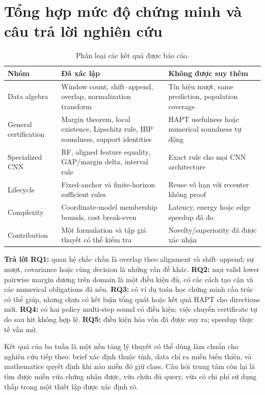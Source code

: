 \documentclass[11pt,a4paper]{article}
\theoremstyle{remark}
\begin{document}
\section{Tổng hợp mức độ chứng minh và câu trả lời nghiên cứu}
\begin{table}[htbp]\centering\small
\caption{Phân loại các kết quả được báo cáo.}
\begin{tabularx}{\linewidth}{@{}p{3.6cm}YY@{}}\toprule
Nhóm & Đã xác lập & Không được suy thêm\\\midrule
Data algebra & Window count, shift--append, overlap, normalization transform
& Tín hiệu mượt, same prediction, population coverage\\
General certification & Margin theorem, local existence, Lipschitz rule,
IBP soundness, support identities & HAPT usefulness hoặc numerical soundness tự động\\
Specialized CNN & RF, aligned feature equality, GAP/margin delta, interval rule
& Exact rule cho mọi CNN architecture\\
Lifecycle & Fixed-anchor và finite-horizon sufficient rules & Reuse vô hạn
với recenter không proof\\
Complexity & Coordinate-model membership bounds, cost break-even
& Latency, energy hoặc edge speedup đã đo\\
Contribution & Một formulation và tập giả thuyết có thể kiểm tra
& Novelty/superiority đã được xác nhận\\\bottomrule
\end{tabularx}
\end{table}
\textbf{Trả lời RQ1:} quan hệ chắc chắn là overlap theo alignment và
shift--append; sự mượt, covariance hoặc cùng decision là những vấn đề khác.
\textbf{RQ2:} mọi valid lower pairwise margin dương trên domain là một
điều kiện đủ, có các cách tạo cận và các numerical obligations đã nêu.
\textbf{RQ3:} có ví dụ toán học chứng minh cấu trúc có thể giúp, nhưng
chưa có kết luận tổng quát hoặc kết quả HAPT cho directions mới.
\textbf{RQ4:} có hai policy multi-step sound có điều kiện; việc chuyển
certificate tự do sau hit không hợp lệ.
\textbf{RQ5:} điều kiện hòa vốn đã được suy ra; speedup thực tế vẫn mở.

Kết quả của ba tuần là một nền tảng lý thuyết có thể dùng làm chuẩn cho
nghiên cứu tiếp theo: brief xác định thuộc tính, data chỉ ra miền biến thiên,
và mathematics quyết định khi nào miền đó giữ class. Câu hỏi trung tâm còn
lại là tìm được miền vừa chứng nhận được, vừa chứa đủ query, vừa có chi
phí sử dụng thấp trong một thiết lập được xác định rõ.
\end{document}
